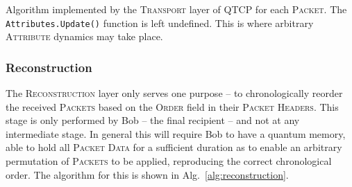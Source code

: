 \begin{table}[!htb]
\caption{Algorithm implemented by the \textsc{Transport} layer of QTCP for each \textsc{Packet}. The \texttt{Attributes.Update()} function is left undefined. This is where arbitrary \textsc{Attribute} dynamics may take place.} \label{alg:transport_alg}
\end{table}

%
%

\subsubsection{Reconstruction}  \label{sec:reconstruction_layer}

The \textsc{Reconstruction} layer only serves one purpose -- to chronologically reorder the received \textsc{Packets} based on the \textsc{Order} field in their \textsc{Packet Headers}. This stage is only performed by Bob -- the final recipient -- and not at any intermediate stage. In general this will require Bob to have a quantum memory, able to hold all \textsc{Packet Data} for a sufficient duration as to enable an arbitrary permutation of \textsc{Packets} to be applied, reproducing the correct chronological order. The algorithm for this is shown in Alg.~\ref{alg:reconstruction}.

